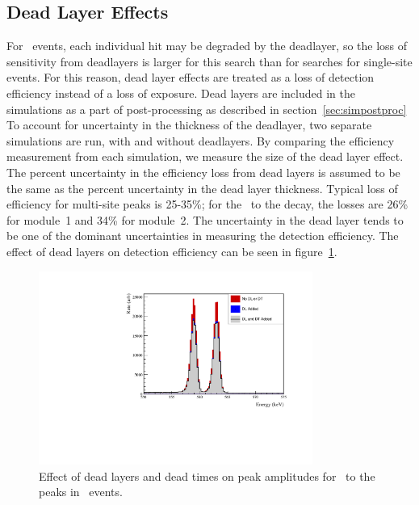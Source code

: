 \documentclass[/main.tex]{subfiles}
\begin{document}
\subsection{Dead Layer Effects} \label{sec:DL}
For \msmd\ events, each individual hit may be degraded by the deadlayer, so the loss of sensitivity from deadlayers is larger for this search than for searches for single-site events.
For this reason, dead layer effects are treated as a loss of detection efficiency instead of a loss of exposure.
Dead layers are included in the simulations as a part of post-processing as described in section~\ref{sec:simpostproc}
To account for uncertainty in the thickness of the deadlayer, two separate simulations are run, with and without deadlayers.
By comparing the efficiency measurement from each simulation, we measure the size of the dead layer effect.
The percent uncertainty in the efficiency loss from dead layers is assumed to be the same as the percent uncertainty in the dead layer thickness.
Typical loss of efficiency for multi-site peaks is 25-35\%; for the \tnbb\ to the  decay, the losses are 26\% for module~1 and 34\% for module~2.
The uncertainty in the dead layer tends to be one of the dominant uncertainties in measuring the detection efficiency.
The effect of dead layers on detection efficiency can be seen in figure~\ref{fig:dldt}.
\\
\begin{figure}
  \centering
  \includegraphics[width=0.8\textwidth]{DeadLayerDeadTime}
  \caption[Simulated effect of dead layers and dead times]{\label{fig:dldt}
    Effect of dead layers and dead times on peak amplitudes for \tnbb\ to the  peaks in \msmd\ events.
  }
\end{figure}
\end{document}
